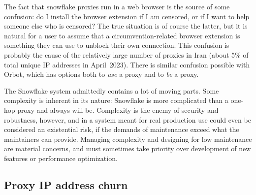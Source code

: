 \documentclass[letterpaper,twocolumn]{article}
\begin{document}
The fact that snowflake proxies run in a web browser
is the source of some confusion:
do I install the browser extension if I am censored,
or if I want to help someone else who is censored?
The true situation is of course the latter,
but it is natural for a user to assume
that a circumvention-related browser extension is something
they can use to unblock their own connection.
This confusion is probably the cause of
the relatively large number of proxies in Iran
(about 5\% of total unique IP addresses in April~2023).
There is similar confusion possible with Orbot,
which has options both
to \emph{use} a proxy and to \emph{be} a proxy.

The Snowflake system
admittedly contains a lot of moving parts.
Some complexity is inherent in its nature:
Snowflake is more complicated than a one-hop proxy
and always will be.
Complexity is the enemy of security and robustness, however,
and in a system meant for real production use
could even be considered an existential risk,
if the demands of maintenance exceed what the maintainers can provide.
Managing complexity and designing for low maintenance
are material concerns,
and must sometimes take priority over
development of new features or performance optimization.


\subsection{Proxy IP address churn}
\label{sec:proxy-churn}


\end{document}
